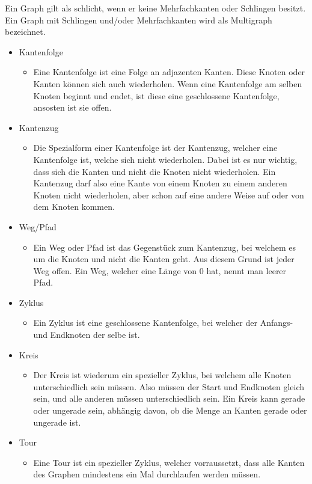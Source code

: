 \documentclass{article}
\begin{document}
	Ein Graph gilt als schlicht, wenn er keine Mehrfachkanten oder Schlingen besitzt. Ein Graph mit Schlingen und/oder Mehrfachkanten wird als Multigraph bezeichnet.
	\begin{itemize}
		\item{Kantenfolge}
		\begin{itemize}
			\item{Eine Kantenfolge ist eine Folge an adjazenten Kanten. Diese Knoten oder Kanten können sich auch wiederholen. Wenn eine Kantenfolge am selben Knoten beginnt und endet, ist diese eine geschlossene Kantenfolge, ansosten ist sie offen.}
		\end{itemize}
		\item{Kantenzug}
		\begin{itemize}
			\item{Die Spezialform einer Kantenfolge ist der Kantenzug, welcher eine Kantenfolge ist, welche sich nicht wiederholen. Dabei ist es nur wichtig, dass sich die Kanten und nicht die Knoten nicht wiederholen. Ein Kantenzug darf also eine Kante von einem Knoten zu einem anderen Knoten nicht wiederholen, aber schon auf eine andere Weise auf oder von dem Knoten kommen.}
		\end{itemize}
		\item{Weg/Pfad}
		\begin{itemize}
			\item{Ein Weg oder Pfad ist das Gegenstück zum Kantenzug, bei welchem es um die Knoten und nicht die Kanten geht. Aus diesem Grund ist jeder Weg offen. Ein Weg, welcher eine Länge von 0 hat, nennt man leerer Pfad.}
		\end{itemize}
	\end{itemize}
	\begin{itemize}
		\item{Zyklus}
		\begin{itemize}
			\item{Ein Zyklus ist eine geschlossene Kantenfolge, bei welcher der Anfangs- und Endknoten der selbe ist.}
		\end{itemize}
		\item{Kreis}
		\begin{itemize}
			\item{Der Kreis ist wiederum ein spezieller Zyklus, bei welchem alle Knoten unterschiedlich sein müssen. Also müssen der Start und Endknoten gleich sein, und alle anderen müssen unterschiedlich sein. Ein Kreis kann gerade oder ungerade sein, abhängig davon, ob die Menge an Kanten gerade oder ungerade ist.}
		\end{itemize}
		\item{Tour}
		\begin{itemize}
			\item{Eine Tour ist ein spezieller Zyklus, welcher vorraussetzt, dass alle Kanten des Graphen mindestens ein Mal durchlaufen werden müssen.}
		\end{itemize}
	\end{itemize}
\end{document}
